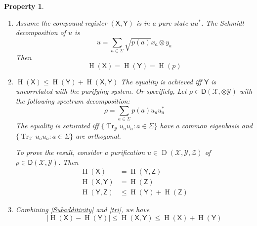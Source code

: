 \documentclass[aps,pra,onecolumn,notitlepage,superscriptaddress]{revtex4-1}
\newcommand{\reg}[1]{\mathsf{#1}}
\newcommand{\spc}[1]{\mathcal{#1}}
\newcommand{\D}{\mathsf{D}}
\newcommand{\Tr}{\operatorname{Tr}}
\newcommand{\op}[1]{\operatorname{#1}}
\newtheorem{proper}{Property}
\begin{document}
\begin{proper}
\begin{enumerate}
            \item Assume the compound register $(\reg X,\reg Y)$ is in a pure state $uu^*$. The Schmidt decomposition of $u$ is
            \begin{equation}
                u = \sum_{a \in \Sigma} \sqrt{p(a)} x_a \otimes y_a
            \end{equation}
            Then
            \begin{equation}
                \op H(\reg X) = \op H(\reg Y) = \op H(p)
            \end{equation}

            \item $\op H(\reg X) \leq \op H(\reg Y) + \op H(\reg X, \reg Y)$ \label{tri}
            The equality is achieved iff $\reg Y$ is uncorrelated with the purifying system. Or specificly, Let $\rho \in \D(\spc X, \otimes \spc Y)$ with the following spectrum decomposition:
            \begin{equation}
                \rho = \sum_{a \in \Sigma} p(a) u_a u_a^*
            \end{equation}
            The equality is saturated iff $\{ \Tr_{\spc Y} u_au_a : a \in \Sigma \}$ have a common eigenbasis and $\{ \Tr_{\spc X} u_au_a : a \in \Sigma \}$ are orthogonal.

            To prove the result, consider a purification $u \in \op D(\spc X, \spc Y, \spc Z)$ of $\rho \in \D(\spc X, \spc Y)$. Then
            \begin{align*}
                \op H(\reg X) &= \op H(\reg Y, \reg Z) \\
                \op H(\reg X, \reg Y) &= \op H(\reg Z) \\
                \op H(\reg Y, \reg Z) &\leq \op H(\reg Y) + \op H(\reg Z)
            \end{align*}

            \item Combining \ref{Subadditivity} and \ref{tri}, we have
            \begin{equation}
                |\op H(\reg X) - \op H(\reg Y)| \leq \op H(\reg X, \reg Y) \leq \op H(\reg X) + \op H(\reg Y)
            \end{equation}
        \end{enumerate}
    \end{proper}
\end{document}
